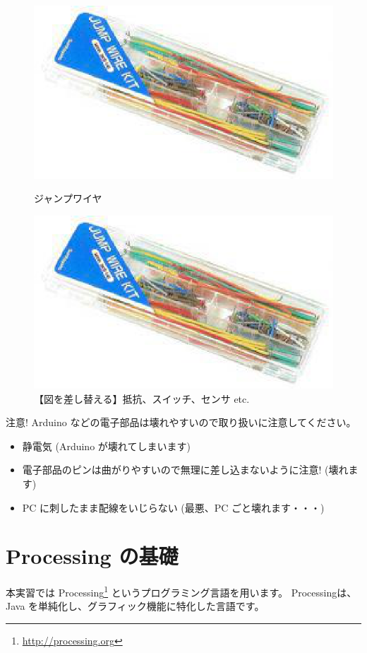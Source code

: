 \documentclass[11pt,a4paper]{jarticle}
\begin{document}
\begin{figure}[h!]
 \begin{minipage}{0.5\columnwidth}
  \centering
  \includegraphics[height=0.4\columnwidth]{img/jumpwire.eps}
  \caption{ジャンプワイヤ}
 \end{minipage}
 \begin{minipage}{0.5\columnwidth}
  \centering
  \includegraphics[height=0.4\columnwidth]{img/jumpwire.eps}
  \caption{【図を差し替える】抵抗、スイッチ、センサ etc.}
 \end{minipage}
\end{figure}

\begin{itembox}{注意!}
 Arduino などの電子部品は壊れやすいので取り扱いに注意してください。
 \begin{itemize}
  \item 静電気 (Arduino が壊れてしまいます)
  \item 電子部品のピンは曲がりやすいので無理に差し込まないように注意! (壊れます)
  \item PC に刺したまま配線をいじらない (最悪、PC ごと壊れます・・・)
 \end{itemize}
\end{itembox}


\section{Processing の基礎}
本実習では Processing\footnote{\url{http://processing.org}} というプログラミング言語を用います。
Processingは、Java を単純化し、グラフィック機能に特化した言語です。
\end{document}
